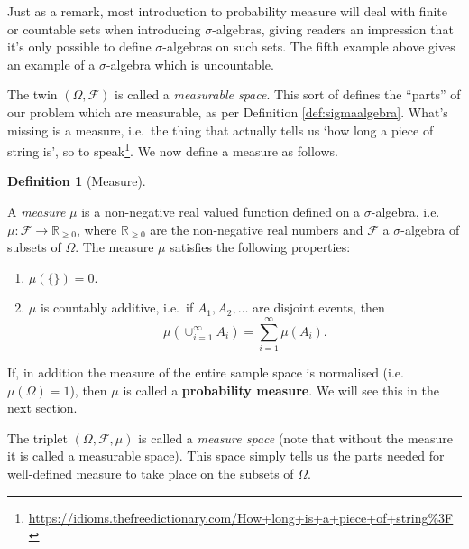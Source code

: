 \documentclass[
]{book}
\providecommand{\tightlist}{%
  \setlength{\itemsep}{0pt}\setlength{\parskip}{0pt}}
\newcommand{\bbR}{\mathbb{R}}
\newcommand{\cF}{{\mathcal F}}
\theoremstyle{definition}
\newtheorem{definition}{Definition}[chapter]
\theoremstyle{definition}
\theoremstyle{definition}
\theoremstyle{definition}
\theoremstyle{remark}
\begin{document}
Just as a remark, most introduction to probability measure will deal with finite or countable sets when introducing \(\sigma\)-algebras, giving readers an impression that it's only possible to define \(\sigma\)-algebras on such sets. The fifth example above gives an example of a \(\sigma\)-algebra which is uncountable.

The twin \((\Omega,\cF)\) is called a \emph{measurable space}. This sort of defines the ``parts'' of our problem which are measurable, as per Definition \ref{def:sigmaalgebra}. What's missing is a measure, i.e.~the thing that actually tells us `how long a piece of string is', so to speak\footnote{\url{https://idioms.thefreedictionary.com/How+long+is+a+piece+of+string\%3F}}. We now define a measure as follows.

\begin{definition}[Measure]
\protect\hypertarget{def:measure}{}\label{def:measure}

A \emph{measure} \(\mu\) is a non-negative real valued function defined on a \(\sigma\)-algebra, i.e.~\(\mu:\cF\to\bbR_{\geq 0}\), where \(\bbR_{\geq 0}\) are the non-negative real numbers and \(\cF\) a \(\sigma\)-algebra of subsets of \(\Omega\). The measure \(\mu\) satisfies the following properties:

\begin{enumerate}
\def\labelenumi{\roman{enumi}.}
\tightlist
\item
  \(\mu(\{\})=0\).
\item
  \(\mu\) is countably additive, i.e.~if \(A_1,A_2,\dots\) are disjoint events, then \[\mu\left( \cup_{i=1}^\infty A_i \right) = \sum_{i=1}^\infty \mu(A_i).\]
\end{enumerate}

\end{definition}

If, in addition the measure of the entire sample space is normalised (i.e.~\(\mu(\Omega)=1\)), then \(\mu\) is called a \textbf{probability measure}. We will see this in the next section.

The triplet \((\Omega,\cF,\mu)\) is called a \emph{measure space} (note that without the measure it is called a measurable space).
This space simply tells us the parts needed for well-defined measure to take place on the subsets of \(\Omega\).
\end{document}
